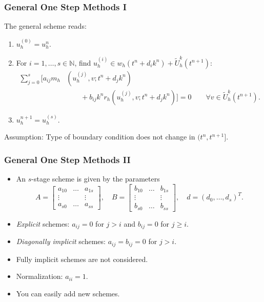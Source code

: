 \begin{frame}
\frametitle{General One Step Methods I}
The general scheme reads:
\begin{enumerate}
\item $u_h^{(0)} = u_h^{n}$.
\item For $i=1,\ldots,s\in\mathbb{N}$, find $u_h^{(i)}\in w_h(t^n+d_i k^n) + \tilde{U}^k_h(t^{n+1})$:
\begin{equation*}
\begin{split}
\sum\limits_{j=0}^{s} \biggl[a_{ij} m_h&\left(u_h^{(j)},v;t^n+d_jk^n\right) \\
&\qquad + b_{ij} k^n r_h\left(u_h^{(j)}, v;t^n+d_j k^n\right) \biggr] = 0 \qquad \forall v\in \tilde{U}^k_h(t^{n+1}).
\end{split}
\end{equation*}
\item $u_h^{n+1} = u_h^{(s)}$.
\end{enumerate}
Assumption: Type of boundary condition does not change in $(t^n,t^{n+1}]$.
\end{frame}

\begin{frame}
\frametitle{General One Step Methods II}
\begin{itemize}
\item An $s$-stage scheme is given by the parameters
\begin{equation*}
A = \left[\begin{array}{ccc}
a_{10} & \ldots & a_{1s}\\
\vdots &  & \vdots\\
a_{s0} & \ldots & a_{ss}
\end{array}\right],
\quad B = \left[\begin{array}{ccc}
b_{10} & \ldots & b_{1s}\\
\vdots &  & \vdots\\
b_{s0} & \ldots & b_{ss}
\end{array}\right],
\quad d = \left(
d_{0}, \ldots, d_{s}
\right)^T.
\end{equation*}
\item \textit{Explicit} schemes: $a_{ij} = 0$ for $j>i$ and $b_{ij}=0$ for $j\geq i$.
\item \textit{Diagonally implicit} schemes: $a_{ij} = b_{ij}= 0$ for $j>i$.
\item Fully implicit schemes are not considered.
\item Normalization: $a_{ii}=1$.
\item You can easily add new schemes.
\end{itemize}
\end{frame}

